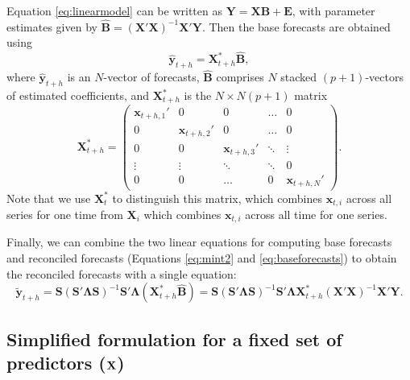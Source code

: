 \documentclass[11pt,a4paper,]{article}
\begin{document}
Equation \eqref{eq:linearmodel} can be written as \(\bm{Y} = \bm{X} \bm{B} + \bm{E}\), with parameter estimates given by \(\hat{\bm{B}} = (\bm{X}'\bm{X})^{-1} \bm{X}'\bm{Y}\). Then the base forecasts are obtained using
\begin{equation}\label{eq:baseforecasts}
  \hat{\bm{y}}_{t+h} = \bm{X}_{t+h}^* \hat{\bm{B}},
\end{equation}
where \(\hat{\bm{y}}_{t+h}\) is an \(N\)-vector of forecasts, \(\hat{\bm{B}}\) comprises \(N\) stacked \((p+1)\)-vectors of estimated coefficients, and \(\bm{X}_{t+h}^*\) is the \(N\times N(p+1)\) matrix
\pagebreak[3]\begin{equation}
  \bm{X}_{t+h}^* =
  \begin{pmatrix}
  \bm{x}_{t+h,1}' & 0               & 0               & \dots  & 0\\
  0               & \bm{x}_{t+h,2}' & 0               & \dots  & 0\\
  0               & 0               & \bm{x}_{t+h,3}' & \ddots & \vdots \\
  \vdots          & \vdots          & \ddots          & \ddots & 0\\
  0               & 0               & \dots           & 0      & \bm{x}_{t+h,N}'
  \end{pmatrix}.
\end{equation}
Note that we use \(\bm{X}^*_{t}\) to distinguish this matrix, which combines \(\bm{x}_{t,i}\) across all series for one time from \(\bm{X}_i\) which combines \(\bm{x}_{t,i}\) across all time for one series.

Finally, we can combine the two linear equations for computing base forecasts and reconciled forecasts (Equations \eqref{eq:mint2} and \eqref{eq:baseforecasts}) to obtain the reconciled forecasts with a single equation:
\begin{equation}\label{eq:singlestep}
    \tilde{\bm{y}}_{t+h} = \bm{S}(\bm{S}'\bm{\Lambda}\bm{S})^{-1}\bm{S}'\bm{\Lambda}
                            (\bm{X}_{t+h}^* \hat{\bm{B}})
                         = \bm{S}(\bm{S}'\bm{\Lambda}\bm{S})^{-1}\bm{S}'\bm{\Lambda}
                            \bm{X}_{t+h}^* (\bm{X}'\bm{X})^{-1} \bm{X}'\bm{Y}.
\end{equation}

\hypertarget{simplified-formulation-for-a-fixed-set-of-predictors-bf-x}{%
\subsection{\texorpdfstring{Simplified formulation for a fixed set of predictors (\(\bf {X}\)) \label{sec:proposedapproach2}}{Simplified formulation for a fixed set of predictors (\textbackslash bf \{X\}) }}\label{simplified-formulation-for-a-fixed-set-of-predictors-bf-x}}
\end{document}
